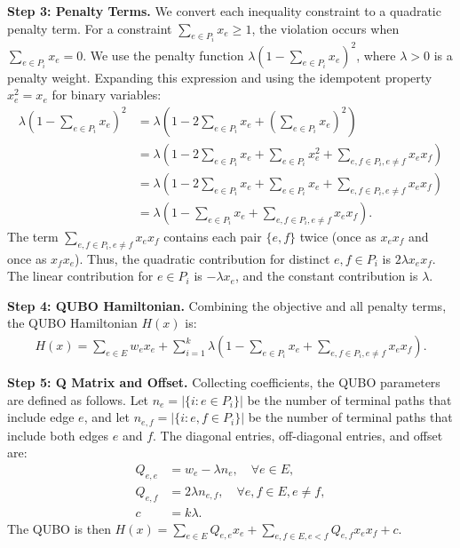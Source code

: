 \documentclass[12pt]{article}
\begin{document}
\textbf{Step 3: Penalty Terms.}
We convert each inequality constraint to a quadratic penalty term. For a constraint $\sum_{e \in P_i} x_e \ge 1$, the violation occurs when $\sum_{e \in P_i} x_e = 0$. We use the penalty function $\lambda \left(1 - \sum_{e \in P_i} x_e\right)^2$, where $\lambda > 0$ is a penalty weight. Expanding this expression and using the idempotent property $x_e^2 = x_e$ for binary variables:
\begin{align}
    \lambda \left(1 - \sum_{e \in P_i} x_e\right)^2 &= \lambda \left(1 - 2\sum_{e \in P_i} x_e + \left(\sum_{e \in P_i} x_e\right)^2 \right) \\
    &= \lambda \left(1 - 2\sum_{e \in P_i} x_e + \sum_{e \in P_i} x_e^2 + \sum_{e,f \in P_i, e \neq f} x_e x_f \right) \\
    &= \lambda \left(1 - 2\sum_{e \in P_i} x_e + \sum_{e \in P_i} x_e + \sum_{e,f \in P_i, e \neq f} x_e x_f \right) \\
    &= \lambda \left(1 - \sum_{e \in P_i} x_e + \sum_{e,f \in P_i, e \neq f} x_e x_f \right).
\end{align}
The term $\sum_{e,f \in P_i, e \neq f} x_e x_f$ contains each pair $\{e,f\}$ twice (once as $x_e x_f$ and once as $x_f x_e$). Thus, the quadratic contribution for distinct $e,f \in P_i$ is $2\lambda x_e x_f$. The linear contribution for $e \in P_i$ is $-\lambda x_e$, and the constant contribution is $\lambda$.

\textbf{Step 4: QUBO Hamiltonian.}
Combining the objective and all penalty terms, the QUBO Hamiltonian $H(x)$ is:
\begin{align}
    H(x) = \sum_{e \in E} w_e x_e + \sum_{i=1}^k \lambda \left(1 - \sum_{e \in P_i} x_e + \sum_{e,f \in P_i, e \neq f} x_e x_f \right).
\end{align}

\textbf{Step 5: Q Matrix and Offset.}
Collecting coefficients, the QUBO parameters are defined as follows. Let $n_e = |\{i : e \in P_i\}|$ be the number of terminal paths that include edge $e$, and let $n_{e,f} = |\{i : e,f \in P_i\}|$ be the number of terminal paths that include both edges $e$ and $f$. The diagonal entries, off-diagonal entries, and offset are:
\begin{align}
    Q_{e,e} &= w_e - \lambda n_e, \quad \forall e \in E, \\
    Q_{e,f} &= 2\lambda n_{e,f}, \quad \forall e,f \in E, e \neq f, \\
    c &= k \lambda.
\end{align}
The QUBO is then $H(x) = \sum_{e \in E} Q_{e,e} x_e + \sum_{e,f \in E, e < f} Q_{e,f} x_e x_f + c$.
\end{document}
